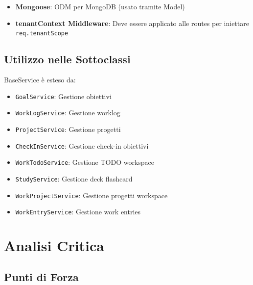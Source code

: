 \documentclass[11pt,a4paper]{article}
\begin{document}
\begin{itemize}
    \item \textbf{Mongoose}: ODM per MongoDB (usato tramite Model)
    \item \textbf{tenantContext Middleware}: Deve essere applicato alle routes per iniettare \texttt{req.tenantScope}
\end{itemize}

\subsection{Utilizzo nelle Sottoclassi}

BaseService è esteso da:
\begin{itemize}
    \item \texttt{GoalService}: Gestione obiettivi
    \item \texttt{WorkLogService}: Gestione worklog
    \item \texttt{ProjectService}: Gestione progetti
    \item \texttt{CheckInService}: Gestione check-in obiettivi
    \item \texttt{WorkTodoService}: Gestione TODO workspace
    \item \texttt{StudyService}: Gestione deck flashcard
    \item \texttt{WorkProjectService}: Gestione progetti workspace
    \item \texttt{WorkEntryService}: Gestione work entries
\end{itemize}

\section{Analisi Critica}

\subsection{Punti di Forza}
\end{document}
